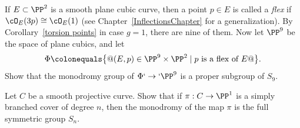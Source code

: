 \begin{exercise}
If $E \subset \PP^2$ is a smooth plane cubic curve, then a point $p \in E$
is called a
\textit{flex}
%
if $\cO_E(3p) \cong \cO_E(1)$ (see Chapter~\ref{InflectionsChapter} for a generalization). By Corollary~\ref{torsion
points} in case $g=1$, there are nine of them. Now let $\PP^9$ be the
space of
plane cubics,
%
and let
$$
\Phi \colonequals  \big\{@(E, p) \in \PP^9 \times \PP^2 \mid p \text{ is a
flex of } E@ \big \}.
$$
Show that the monodromy group of $\Phi` \to `\PP^9$ is a proper subgroup
of $S_9$.
\end{exercise}

\begin{exercise}
Let $C$ be a smooth projective curve. Show that if $\pi : C \to \PP^1$
is a simply branched cover of degree $n$, then the monodromy of the map
$\pi$ is the full symmetric group $S_n$.
%
\end{exercise}

